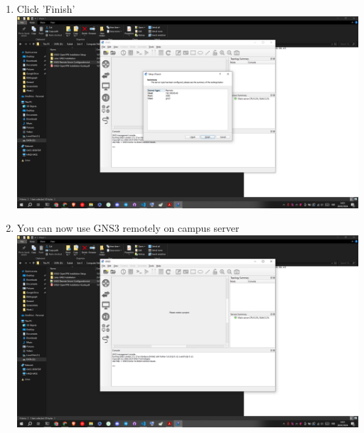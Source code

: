 \documentclass[12pt,titlepage]{article}
\begin{document}
\begin{enumerate}
    \item Click 'Finish' \\ \includegraphics[width=.9\textwidth]{images/figures/Screenshot (460).png}
    \newpage
    \item You can now use GNS3 remotely on campus server \\ \includegraphics[width=.9\textwidth]{images/figures/Screenshot (462).png}
\end{enumerate}
\end{document}
